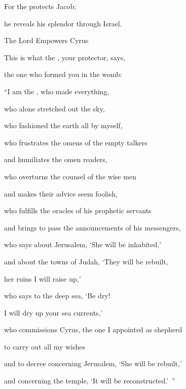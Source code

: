 {\par }{\Q For
the
{}
protects
Jacob;
\par }{\Q he reveals his splendor
through Israel.
\par }{\SH The Lord Empowers Cyrus
\par }{\Q {}This is what
the {}, your protector,
says,
\par }{\Q the one who formed
you in the womb:
\par }{\Q “I am
the {}, who made
everything,
\par }{\Q who alone
stretched
out the sky,
\par }{\Q who fashioned
the earth all by myself,
\par }{\Q {}who frustrates
the omens
of the empty talkers
\par }{\Q and humiliates
the omen readers,
\par }{\Q who overturns
the counsel
of the wise men
\par }{\Q and makes their advice seem foolish,
\par }{\Q {}who
fulfills
the oracles of his prophetic
servants
\par }{\Q and brings to pass the announcements
of his messengers,
\par }{\Q who says
about Jerusalem, ‘She will be inhabited,’
\par }{\Q and about the towns
of Judah,
‘They will be rebuilt,
\par }{\Q her ruins
I will raise up,’
\par }{\Q {}who says
to the deep
sea, ‘Be dry!
\par }{\Q I will dry up
your sea currents,’
\par }{\Q {}who commissions Cyrus,
the one I appointed as shepherd
\par }{\Q to carry out
all
my wishes

\par }{\Q and to decree concerning
Jerusalem,
‘She will be rebuilt,’
\par }{\Q and concerning the temple,
‘It will be reconstructed.’ ”

\par }
